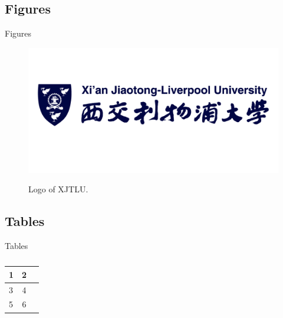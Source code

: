 \documentclass{libs/XJTLU_format}
\begin{document}
\subsection{Figures}
\begin{frame}{Figures}
    \begin{figure}
        \centering
        \caption{Logo of XJTLU.}
        \includegraphics[scale=0.5]{libs/XJTLU_logo.png}
        \label{fig:XJTLU_logo}
    \end{figure}
\end{frame}

\subsection{Tables}
\begin{frame}{Tables}
\begin{table}[hbt]
  \begin{tabular}{l|cc}
    1& 2& \\
    \hline
    3& 4& \\
    5& 6&
  \end{tabular}
  \caption{}
\end{table}

\end{frame}

\end{document}
